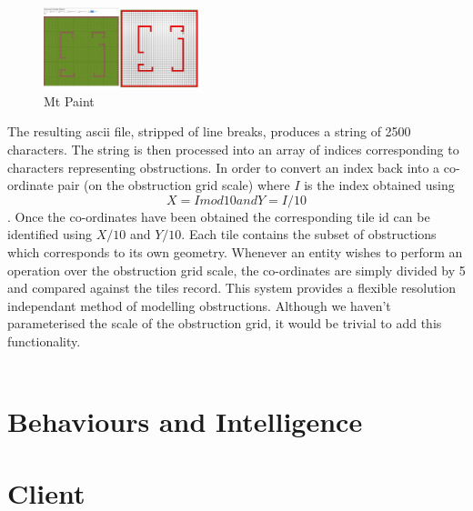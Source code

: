 \documentclass[10pt, a4paper, conference, compsocconf]{IEEEtran}
\begin{document}
\begin{figure}[h]
  \centering
  \includegraphics[width=0.4\textwidth]{../img/mt_paint.png}
\caption{Mt Paint}
    \label{fig:mtpaint}
\end{figure}

The resulting ascii file, stripped of line breaks, produces a string of 2500 characters. The string is then processed into an array of indices corresponding to characters representing obstructions. In order to convert an index back into a co-ordinate pair (on the obstruction grid scale) where \(I\) is the index obtained using \[X = I mod 10 and Y = I / 10\].
Once the co-ordinates have been obtained the corresponding tile id can be identified using \(X / 10\) and \(Y / 10\). Each tile contains the subset of obstructions which corresponds to its own geometry. Whenever an entity wishes to perform an operation over the obstruction grid scale, the co-ordinates are simply divided by 5 and compared against the tiles record. This system provides a flexible resolution independant method of modelling obstructions. Although we haven't parameterised the scale of the obstruction grid, it would be trivial to add this functionality.\\
\\
\section{Behaviours and Intelligence \label{behaviours}}

\section{Client \label{client}}


%
%
\end{document}
